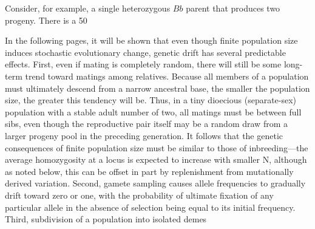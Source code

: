 \documentclass{article}
\begin{document}
Consider, for example, a single heterozygous  $ Bb $ parent that produces two progeny. There is a 50%

In the following pages, it will be shown that even though finite population size induces stochastic evolutionary change, genetic drift has several predictable effects. First, even if mating is completely random, there will still be some long-term trend toward matings among relatives. Because all members of a population must ultimately descend from a narrow ancestral base, the smaller the population size, the greater this tendency will be. Thus, in a tiny dioecious (separate-sex) population with a stable adult number of two, all matings must be between full sibs, even though the reproductive pair itself may be a random draw from a larger progeny pool in the preceding generation. It follows that the genetic consequences of finite population size must be similar to those of inbreeding—the average homozygosity at a locus is expected to increase with smaller N, although as noted below, this can be offset in part by replenishment from mutationally derived variation. Second, gamete sampling causes allele frequencies to gradually drift toward zero or one, with the probability of ultimate fixation of any particular allele in the absence of selection being equal to its initial frequency. Third, subdivision of a population into isolated demes
\end{document}
